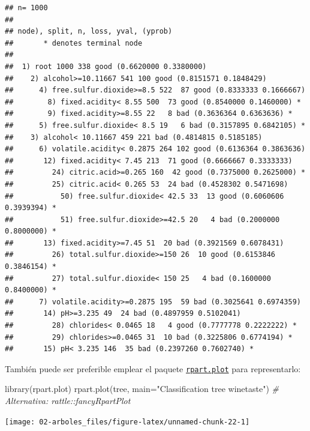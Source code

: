 \documentclass[
]{book}
\newenvironment{Shaded}{\begin{snugshade}}{\end{snugshade}}
\newcommand{\AttributeTok}[1]{\textcolor[rgb]{0.77,0.63,0.00}{#1}}
\newcommand{\CommentTok}[1]{\textcolor[rgb]{0.56,0.35,0.01}{\textit{#1}}}
\newcommand{\FunctionTok}[1]{\textcolor[rgb]{0.00,0.00,0.00}{#1}}
\newcommand{\NormalTok}[1]{#1}
\newcommand{\StringTok}[1]{\textcolor[rgb]{0.31,0.60,0.02}{#1}}
\theoremstyle{break}
\theoremstyle{definition}
\theoremstyle{definition}
\theoremstyle{definition}
\theoremstyle{definition}
\theoremstyle{remark}
\begin{document}
\begin{verbatim}
## n= 1000 
## 
## node), split, n, loss, yval, (yprob)
##       * denotes terminal node
## 
##  1) root 1000 338 good (0.6620000 0.3380000)  
##    2) alcohol>=10.11667 541 100 good (0.8151571 0.1848429)  
##      4) free.sulfur.dioxide>=8.5 522  87 good (0.8333333 0.1666667)  
##        8) fixed.acidity< 8.55 500  73 good (0.8540000 0.1460000) *
##        9) fixed.acidity>=8.55 22   8 bad (0.3636364 0.6363636) *
##      5) free.sulfur.dioxide< 8.5 19   6 bad (0.3157895 0.6842105) *
##    3) alcohol< 10.11667 459 221 bad (0.4814815 0.5185185)  
##      6) volatile.acidity< 0.2875 264 102 good (0.6136364 0.3863636)  
##       12) fixed.acidity< 7.45 213  71 good (0.6666667 0.3333333)  
##         24) citric.acid>=0.265 160  42 good (0.7375000 0.2625000) *
##         25) citric.acid< 0.265 53  24 bad (0.4528302 0.5471698)  
##           50) free.sulfur.dioxide< 42.5 33  13 good (0.6060606 0.3939394) *
##           51) free.sulfur.dioxide>=42.5 20   4 bad (0.2000000 0.8000000) *
##       13) fixed.acidity>=7.45 51  20 bad (0.3921569 0.6078431)  
##         26) total.sulfur.dioxide>=150 26  10 good (0.6153846 0.3846154) *
##         27) total.sulfur.dioxide< 150 25   4 bad (0.1600000 0.8400000) *
##      7) volatile.acidity>=0.2875 195  59 bad (0.3025641 0.6974359)  
##       14) pH>=3.235 49  24 bad (0.4897959 0.5102041)  
##         28) chlorides< 0.0465 18   4 good (0.7777778 0.2222222) *
##         29) chlorides>=0.0465 31  10 bad (0.3225806 0.6774194) *
##       15) pH< 3.235 146  35 bad (0.2397260 0.7602740) *
\end{verbatim}

También puede ser preferible emplear el paquete \href{https://CRAN.R-project.org/package=rpart.plot}{\texttt{rpart.plot}} para representarlo:

\begin{Shaded}
\begin{Highlighting}[]
\FunctionTok{library}\NormalTok{(rpart.plot)}
\FunctionTok{rpart.plot}\NormalTok{(tree, }\AttributeTok{main=}\StringTok{"Classification tree winetaste"}\NormalTok{) }\CommentTok{\# Alternativa: rattle::fancyRpartPlot}
\end{Highlighting}
\end{Shaded}

\begin{center}\texttt{[image: 02-arboles\_files/figure-latex/unnamed-chunk-22-1]} \end{center}
\end{document}
